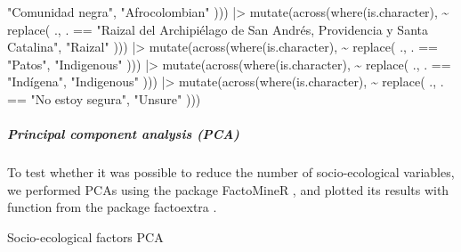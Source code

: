 \documentclass[
  bookmarksnumbered]{article}
\newenvironment{Shaded}{\begin{snugshade}}{\end{snugshade}}
\newcommand{\FunctionTok}[1]{\textcolor[rgb]{0.94,0.94,0.56}{#1}}
\newcommand{\NormalTok}[1]{\textcolor[rgb]{0.80,0.80,0.80}{#1}}
\newcommand{\SpecialCharTok}[1]{\textcolor[rgb]{0.86,0.64,0.64}{#1}}
\newcommand{\StringTok}[1]{\textcolor[rgb]{0.80,0.58,0.58}{#1}}
\begin{document}
\begin{Shaded}
\begin{Highlighting}[]
      \StringTok{"Comunidad negra"}\NormalTok{,}
    \StringTok{"Afrocolombian"}
\NormalTok{  ))) }\SpecialCharTok{|\textgreater{}}
  \FunctionTok{mutate}\NormalTok{(}\FunctionTok{across}\NormalTok{(}\FunctionTok{where}\NormalTok{(is.character), }\SpecialCharTok{\textasciitilde{}} \FunctionTok{replace}\NormalTok{(}
\NormalTok{    ., . }\SpecialCharTok{==}
      \StringTok{"Raizal del Archipiélago de San Andrés, }
\StringTok{       Providencia y Santa Catalina"}\NormalTok{,}
    \StringTok{"Raizal"}
\NormalTok{  ))) }\SpecialCharTok{|\textgreater{}}
  \FunctionTok{mutate}\NormalTok{(}\FunctionTok{across}\NormalTok{(}\FunctionTok{where}\NormalTok{(is.character), }\SpecialCharTok{\textasciitilde{}} \FunctionTok{replace}\NormalTok{(}
\NormalTok{    ., . }\SpecialCharTok{==}
      \StringTok{"Patos"}\NormalTok{,}
    \StringTok{"Indigenous"}
\NormalTok{  ))) }\SpecialCharTok{|\textgreater{}}
  \FunctionTok{mutate}\NormalTok{(}\FunctionTok{across}\NormalTok{(}\FunctionTok{where}\NormalTok{(is.character), }\SpecialCharTok{\textasciitilde{}} \FunctionTok{replace}\NormalTok{(}
\NormalTok{    ., . }\SpecialCharTok{==}
      \StringTok{"Indígena"}\NormalTok{,}
    \StringTok{"Indigenous"}
\NormalTok{  ))) }\SpecialCharTok{|\textgreater{}}
  \FunctionTok{mutate}\NormalTok{(}\FunctionTok{across}\NormalTok{(}\FunctionTok{where}\NormalTok{(is.character), }\SpecialCharTok{\textasciitilde{}} \FunctionTok{replace}\NormalTok{(}
\NormalTok{    ., . }\SpecialCharTok{==}
      \StringTok{"No estoy segura"}\NormalTok{,}
    \StringTok{"Unsure"}
\NormalTok{  )))}
\end{Highlighting}
\end{Shaded}

\subparagraph{Principal component analysis (PCA)}\label{principal-component-analysis-pca}

To test whether it was possible to reduce the number of socio-ecological variables, we performed PCAs using the package FactoMineR \autocite{factominercit}, and plotted its results with function from the package factoextra \autocite{factoextracit}.

Socio-ecological factors PCA
\end{document}
